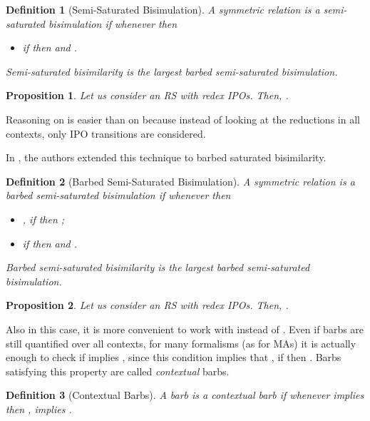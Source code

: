 \documentclass[copyright,creativecommons]{eptcs}
\newcommand{\<}{\langle}
\renewcommand{\>}{\rangle}
\newtheorem{definition}{Definition}{}
\newtheorem{proposition}{Proposition}{}
\begin{document}
\begin{definition}[Semi-Saturated Bisimulation]\label{defSSB}
A symmetric relation  is a \emph{semi-saturated
  bisimulation} if whenever  then
\begin{itemize}
\item if  then  and .
\end{itemize}
\emph{Semi-saturated bisimilarity}  is the largest barbed
semi-saturated bisimulation.
\end{definition}

\begin{proposition}
  \label{theoSemiSatisSat}
Let us consider an RS with redex IPOs. Then,
 .
\end{proposition}
Reasoning on  is easier than on  because
instead of looking at the reductions in all contexts,
only IPO transitions are considered.




In \cite{BGMFOSSACS09}, the authors extended this technique to barbed
saturated bisimilarity.

\begin{definition}[Barbed Semi-Saturated Bisimulation]\label{def:BSSbis}
  A symmetric relation  is a \emph{barbed semi-saturated
  bisimulation} if whenever  then
\begin{itemize}
\item , if  then ;
\item if  then  and .
\end{itemize}
\emph{Barbed semi-saturated bisimilarity}  is the largest
barbed semi-saturated bisimulation.
\end{definition}



\begin{proposition} \label{PropBSS=BS}
Let us consider an RS with redex IPOs. Then,
 .
\end{proposition}

Also in this case, it is more convenient to work with 
instead of . Even if barbs are still quantified over all
contexts, for many formalisms (as for MAs) it is actually enough to
check if  implies , since this condition
implies that , if  then .
Barbs satisfying this property are called \emph{contextual} barbs.

\begin{definition}[Contextual Barbs] \label{contBarb}
A barb  is a \emph{contextual barb} if whenever
 implies  then , 
implies .
\end{definition}
\end{document}
